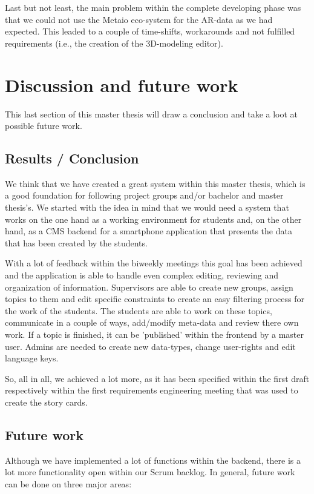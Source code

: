 Last but not least, the main problem within the complete developing phase was that we could not use the Metaio eco-system for the \ac{AR}-data as we had expected. This leaded to a couple of time-shifts, workarounds and not fulfilled requirements (i.e., the creation of the 3D-modeling editor).

\section{Discussion and future work}
This last section of this master thesis will draw a conclusion and take a loot at possible future work.

\subsection{Results / Conclusion}
We think that we have created a great system within this master thesis, which is a good foundation for following project groups and/or bachelor and master thesis's. We started with the idea in mind that we would need a system that works on the one hand as a working environment for students and, on the other hand, as a \ac{CMS} backend for a smartphone application that presents the data that has been created by the students. 

With a lot of feedback within the biweekly meetings this goal has been achieved and the application is able to handle even complex editing, reviewing and organization of information. Supervisors are able to create new groups, assign topics to them and edit specific constraints to create an easy filtering process for the work of the students. The students are able to work on these topics, communicate in a couple of ways, add/modify meta-data and review there own work. If a topic is finished, it can be 'published' within the frontend by a master user. Admins are needed to create new data-types, change user-rights and edit language keys.

So, all in all, we achieved a lot more, as it has been specified within the first draft respectively within the first requirements engineering meeting that was used to create the story cards.

\subsection{Future work}
\label{futurework}
Although we have implemented a lot of functions within the backend, there is a lot more functionality open within our Scrum backlog. In general, future work can be done on three major areas:

